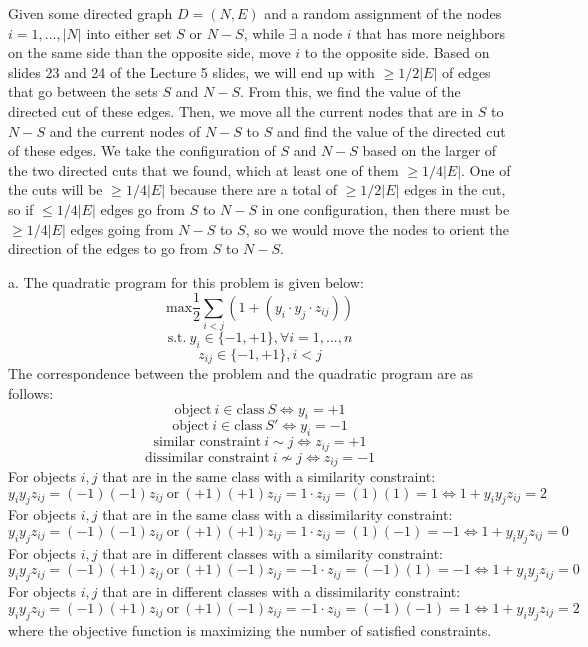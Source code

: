 \documentclass[oneside]{homework} %
\begin{document}
Given some directed graph $D = (N,E)$ and a random assignment of the nodes $i = 1,...,|N|$ into either set $S$ or $N-S$, while $\exists$ a node $i$ that has more neighbors on the same side than the opposite side, move $i$ to the opposite side. Based on slides 23 and 24 of the Lecture 5 slides, we will end up with $\geq 1/2|E|$ of edges that go between the sets $S$ and $N-S$. From this, we find the value of the directed cut of these edges. Then, we move all the current nodes that are in $S$ to $N-S$ and the current nodes of $N-S$ to $S$ and find the value of the directed cut of these edges. We take the configuration of $S$ and $N-S$ based on the larger of the two directed cuts that we found, which at least one of them $\geq 1/4|E|$. One of the cuts will be $\geq 1/4|E|$ because there are a total of $\geq 1/2|E|$ edges in the cut, so if $\leq 1/4|E|$ edges go from $S$ to $N-S$ in one configuration, then there must be $\geq 1/4|E|$ edges going from $N-S$ to $S$, so we would move the nodes to orient the direction of the edges to go from $S$ to $N-S$.

{\large a.} The quadratic program for this problem is given below:
$$\text{max}\frac{1}{2}\sum\limits_{i<j}(1 +(y_i \cdot y_j \cdot z_{ij}))$$
$$\text{s.t.} \ y_i \in \{-1, +1\}, \forall i = 1,...,n$$
$$z_{ij} \in \{-1, +1\}, i < j$$
The correspondence between the problem and the quadratic program are as follows:
$$\text{object} \ i \in \text{class} \ S \Leftrightarrow y_i = +1$$
$$\text{object} \ i \in \text{class} \ S' \Leftrightarrow y_i = -1$$
$$\text{similar constraint} \ i \sim j \Leftrightarrow z_{ij} = +1$$
$$\text{dissimilar constraint} \ i \nsim j \Leftrightarrow z_{ij} = -1$$ 
\newline
For objects $i, j$ that are in the same class with a similarity constraint: $$y_i y_j z_{ij} = (-1)(-1)z_{ij} \ \text{or} \ (+1)(+1)z_{ij} = 1 \cdot z_{ij} = (1)(1) = 1 \Leftrightarrow 1 + y_i y_j z_{ij} = 2$$
For objects $i, j$ that are in the same class with a dissimilarity constraint: $$y_i y_j z_{ij} = (-1)(-1)z_{ij} \ \text{or} \ (+1)(+1)z_{ij} = 1 \cdot z_{ij} = (1)(-1) = -1 \Leftrightarrow 1 + y_i y_j z_{ij} = 0$$
For objects $i, j$ that are in different classes with a similarity constraint: $$y_i y_j z_{ij} = (-1)(+1)z_{ij} \ \text{or} \ (+1)(-1)z_{ij} = -1 \cdot z_{ij} = (-1)(1) = -1 \Leftrightarrow 1 + y_i y_j z_{ij} = 0$$
For objects $i, j$ that are in different classes with a dissimilarity constraint: $$y_i y_j z_{ij} = (-1)(+1)z_{ij} \ \text{or} \ (+1)(-1)z_{ij} = -1 \cdot z_{ij} = (-1)(-1) = 1 \Leftrightarrow 1 + y_i y_j z_{ij} = 2$$
where the objective function is maximizing the number of satisfied constraints.
\end{document}
